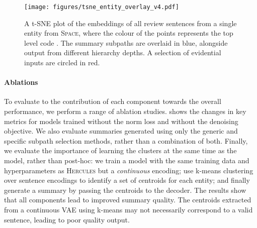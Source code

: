\documentclass[11pt]{article}
\begin{document}
\begin{figure*}[ht!]
    \centering
    
    \texttt{[image: figures/tsne\_entity\_overlay\_v4.pdf]}
\caption{A t-SNE \cite{tsne} plot of the embeddings of all review sentences from a single entity from \textsc{Space}, where the colour of the points represents the top level code . The summary subpaths are overlaid in blue, alongside output from different hierarchy depths. A selection of evidential inputs are circled in red.}
    \vspace{-0.4cm}
    \label{fig:tsne}
\end{figure*}


\paragraph{Ablations}


To evaluate to the contribution of each component towards the overall performance, we perform a range of ablation studies.  shows the changes in key metrics for models trained without the norm loss and without the denoising objective. We also evaluate summaries generated using only the generic and specific subpath selection methods, rather than a combination of both. Finally, we evaluate the importance of learning the clusters at the same time as the model, rather than post-hoc: we train a model with the same training data and hyperparameters as \textsc{Hercules} but a \textit{continuous} encoding; use k-means clustering over sentence encodings to identify a set of centroids for each entity; and finally generate a summary by passing the centroids to the decoder. The results show that all components lead to improved summary quality. 
The centroids extracted from a continuous VAE using k-means may not necessarily correspond to a valid sentence, leading to poor quality output.
\end{document}
